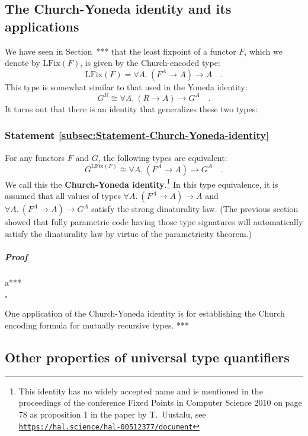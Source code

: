 \subsection{The Church-Yoneda identity and its applications}

We have seen in Section~{*}{*}{*} that the least fixpoint of a functor
$F$, which we denote by $\text{LFix}(F)$, is given by the Church-encoded
type:
\[
\text{LFix}(F)=\forall A.\ (F^{A}\rightarrow A)\rightarrow A\quad.
\]
This type is somewhat similar to that used in the Yoneda identity:
\[
G^{R}\cong\forall A.\ (R\rightarrow A)\rightarrow G^{A}\quad.
\]
It turns out that there is an identity that generalizes these two
types:

\subsubsection{Statement \label{subsec:Statement-Church-Yoneda-identity}\ref{subsec:Statement-Church-Yoneda-identity}}

For any functors $F$ and $G$, the following types are equivalent:
\[
G^{\text{LFix}(F)}\cong\forall A.\ (F^{A}\rightarrow A)\rightarrow G^{A}\quad.
\]
We call this the \textbf{Church-Yoneda
identity}.\footnote{This identity has no widely accepted name and is mentioned in the
proceedings of the conference \textquotedbl Fixed Points in Computer
Science 2010\textquotedbl{} on page 78 as \textquotedbl proposition
1\textquotedbl{} in the paper by T.~Uustalu, see \texttt{\href{https://hal.science/hal-00512377/document}{https://hal.science/hal-00512377/document}}} In this type equivalence, it is assumed that all values of types
$\forall A.\ (F^{A}\rightarrow A)\rightarrow A$ and $\forall A.\ (F^{A}\rightarrow A)\rightarrow G^{A}$
satisfy the strong dinaturality law. (The previous section showed
that fully parametric code having those type signatures will automatically
satisfy the dinaturality law by virtue of the parametricity theorem.)

\subparagraph{Proof}

a{*}{*}{*}

$\square$

One application of the Church-Yoneda identity is for establishing
the Church encoding formula for mutually recursive types. {*}{*}{*}

\subsection{Other properties of universal type quantifiers}

